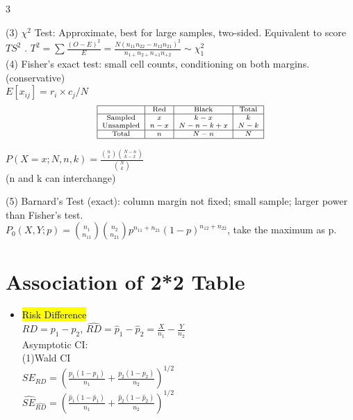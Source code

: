 \documentclass[a4paper,10pt]{article}
\begin{document}
\begin{multicols}{3}
\begin{itemize}
    (3) $\chi^2$ Test: Approximate, best for large samples, two-sided. Equivalent to score $TS^2$ . $T^2=\sum\frac{(O-E)^2}{E}=\frac{N(n_{11}n_{22}-n_{12}n_{21})^2}{n_{1+}n_{2+}n_{+1}n_{+2}}\sim \chi^2_1$\\
    (4) Fisher's exact test: small cell counts, conditioning on both margins. (conservative)\\
    $E[x_{ij}]=r_i\times c_j/N$\\
    \[
    \scriptsize
    \begin{array}{|c|c|c|c|}
    \hline
     & \text{Red} & \text{Black} & \text{Total} \\
    \hline
    \text{Sampled} & x & k - x & k \\
    \text{Unsampled} & n - x & N - n - k + x & N - k \\
    \hline
    \text{Total} & n & N - n & N \\
    \hline
    \end{array}
    \]
    
    $
    P(X = x; N, n, k) = \frac{\binom{n}{x} \binom{N-n}{k-x}}{\binom{N}{k}}
    $\\
    (n and k can interchange)

    (5) Barnard's Test (exact): column margin not fixed; small sample; larger power than Fisher's test.\\
    $P_0(X, Y; p) = \binom{n_1}{n_{11}} \binom{n_2}{n_{21}} p^{n_{11} + n_{21}} (1 - p)^{n_{12} + n_{22}}$, take the maximum as p.
    
\end{itemize}



\section*{Association of 2*2 Table}
\begin{itemize}
    \item \hl{Risk Difference}\\
    $RD = p_1 - p_2$, 
    $\hat{RD} = \hat{p}_1 - \hat{p}_2 = \frac{X}{n_1} - \frac{Y}{n_2}$\\
    Asymptotic CI:\\
    (1)Wald CI\\
    $SE_{RD} = \left( \frac{p_1(1 - p_1)}{n_1} + \frac{p_2(1 - p_2)}{n_2} \right)^{1/2}$\\
    $ \hat{SE}_{\hat{RD}} = \left( \frac{\hat{p}_1(1 - \hat{p}_1)}{n_1} + \frac{\hat{p}_2(1 - \hat{p}_2)}{n_2} \right)^{1/2}$\\
    

\end{itemize}
\end{multicols}
\end{document}
